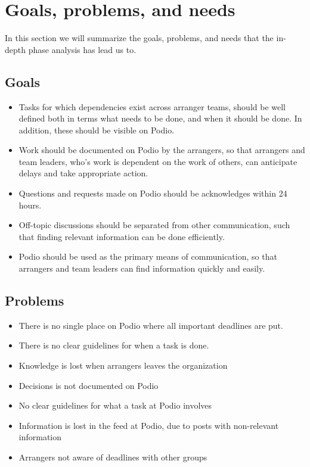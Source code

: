 \section{Goals, problems, and needs}
\label{sec:goprne}
In this section we will summarize the goals, problems, and needs that the
in-depth phase analysis has lead us to.

\subsection{Goals}
\label{subsec:goals}
\begin{itemize}
    \item Tasks for which dependencies exist across arranger teams, should be well defined both in terms what needs to be done, and when it should be done. In addition, these should be visible on Podio.
    \item Work should be documented on Podio by the arrangers, so that arrangers and team leaders, who's work is dependent on the work of others, can anticipate delays and take appropriate action.
    \item Questions and requests made on Podio should be acknowledges within 24 hours.
    \item Off-topic discussions should be separated from other communication, such that finding relevant information can be done efficiently.
    \item Podio should be used as the primary means of communication, so that arrangers and team leaders can find information quickly and easily.
\end{itemize}

\subsection{Problems}
\label{subsec:problems}
\begin{itemize}
    \item There is no single place on Podio where all important deadlines are put.
    \item There is no clear guidelines for when a task is done.
	 \item Knowledge is lost when arrangers leaves the organization
	 \item Decisions is not documented on Podio
	 \item No clear guidelines for what a task at Podio involves
	 \item Information is lost in the feed at Podio, due to posts with non-relevant information
	 \item Arrangers not aware of deadlines with other groups
	 
\end{itemize}

